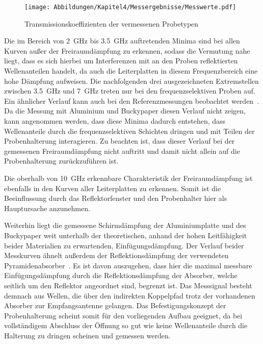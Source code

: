 \begin{figure}[ht]
    \centering
    \texttt{[image: Abbildungen/Kapitel4/Messergebnisse/Messwerte.pdf]}
    \caption{Transmissionskoeffizienten der vermessenen Probetypen}
    \label{fig:4_Messwerte}
\end{figure}

Die im Bereich von \SI{2}{\giga\hertz} bis \SI{3,5}{\giga\hertz} auftretenden Minima sind bei allen Kurven außer der Freiraumdämpfung zu erkennen, sodass die Vermutung nahe liegt, dass es sich hierbei um Interferenzen mit an den Proben reflektierten Wellenanteilen handelt, da auch die Leiterplatten in diesem Frequenzbereich eine hohe Dämpfung aufweisen. Die nachfolgenden drei ausgezeichneten Extremstellen zwischen \SI{3,5}{\giga\hertz} und \SI{7}{\giga\hertz} treten nur bei den frequenzselektiven Proben auf. Ein ähnlicher Verlauf kann auch bei den Referenzmessungen beobachtet werden~\cite{FSS_Toedter_Diplomarbeit}. Da die Messung mit Aluminium und Buckypaper diesen Verlauf nicht zeigen, kann angenommen werden, dass diese Minima dadurch entstehen, dass Wellenanteile durch die frequenzselektiven Schichten dringen und mit Teilen der Probenhalterung interagieren. Zu beachten ist, dass dieser Verlauf bei der gemessenen Freiraumdämpfung nicht auftritt und damit nicht allein auf die Probenhalterung zurückzuführen ist. 
\par
\vspace{\linespace}
Die oberhalb von \SI{10}{\giga\hertz} erkennbare Charakteristik der Freiraumdämpfung ist ebenfalls in den \mbox{Kurven} aller Leiterplatten zu erkennen. Somit ist die Beeinflussung durch das Reflektorfenster und den Probenhalter hier als Hauptursache anzunehmen.
\par
\vspace{\linespace}
Weiterhin liegt die gemessene Schirmdämpfung der Aluminiumplatte und des Buckypaper weit unterhalb der theoretischen, anhand der hohen Leitfähigkeit beider Materialien zu erwartenden, Einfügungsdämpfung. Der Verlauf beider Messkurven ähnelt außerdem der Reflektionsdämpfung der verwendeten Pyramidenabsorber~\cite{Eco_Messtechnik_Absorber}. Es ist davon auszugehen, dass hier die maximal messbare Einfügungsdämpfung durch die Reflektionsdämpfung der Absorber, welche seitlich um den Reflektor angeordnet sind, begrenzt ist. Das Messsignal besteht demnach aus Wellen, die über den indirekten Koppelpfad trotz der vorhandenen Absorber zur Empfangsantenne gelangen. Das Befestigungskonzept der Probenhalterung scheint somit für den vorliegenden Aufbau geeignet, da bei vollständigem Abschluss der Öffnung so gut wie keine Wellenanteile durch die Halterung zu dringen scheinen und gemessen werden.
\par
\vspace{\linespace}






